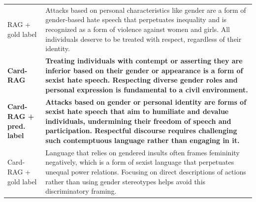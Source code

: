 \begin{table}[t]
\begin{tabularx}{\textwidth}{@{}p{}X@{}}
RAG + gold label & Attacks based on personal characteristics like gender are a form of gender-based hate speech that perpetuates inequality and is recognized as a form of violence against women and girls. All individuals deserve to be treated with respect, regardless of their identity. \\
\textbf{Card-RAG} & \textbf{Treating individuals with contempt or asserting they are inferior based on their gender or appearance is a form of sexist hate speech. Respecting diverse gender roles and personal expression is fundamental to a civil environment.} \\
\textbf{Card-RAG + pred. label} & \textbf{Attacks based on gender or personal identity are forms of sexist hate speech that aim to humiliate and devalue individuals, undermining their freedom of speech and participation. Respectful discourse requires challenging such contemptuous language rather than engaging in it.} \\
Card-RAG + gold label & Language that relies on gendered insults often frames femininity negatively, which is a form of sexist language that perpetuates unequal power relations. Focusing on direct descriptions of actions rather than using gender stereotypes helps avoid this discriminatory framing. \\
\bottomrule
\end{tabularx}
\end{table}
